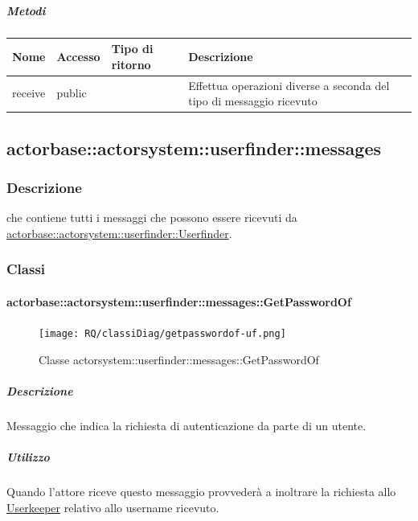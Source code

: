\documentclass{scalatekids-article}
\begin{document}
\subparagraph{Metodi}

\begin{tabular}{| l | l | l | l |}
  \hline
  Nome & Accesso & Tipo di ritorno & Descrizione\\
  \hline
  receive & public &  & Effettua operazioni diverse a seconda del tipo di messaggio ricevuto\\
  \hline
\end{tabular}

\subsection{actorbase::actorsystem::userfinder::messages}
\label{sec:actorbase::actorsystem::userfinder::messages}

\subsubsection{Descrizione}
 che contiene tutti i messaggi che possono essere ricevuti da
\hyperref[sec:actorbase::actorsystem::userfinder::Userfinder]{actorbase::actorsystem::userfinder::Userfinder}.

\subsubsection{Classi}

\paragraph{actorbase::actorsystem::userfinder::messages::GetPasswordOf}
\label{sec:actorbase::actorsystem::userfinder::messages::GetPasswordOf}

\begin{figure}[H]
   \begin{center}
     \texttt{[image: RQ/classiDiag/getpasswordof-uf.png]}
     \caption{Classe actorsystem::userfinder::messages::GetPasswordOf}
   \end{center}
 \end{figure}

\subparagraph{Descrizione}
Messaggio che indica la richiesta di autenticazione da parte di un utente.\\

\subparagraph{Utilizzo}
Quando l'attore riceve questo messaggio provvederà a inoltrare la richiesta
allo \hyperref[sec:actorbase::actorsystem::userkeeper::Userkeeper]{Userkeeper}
relativo allo username ricevuto.
\end{document}
